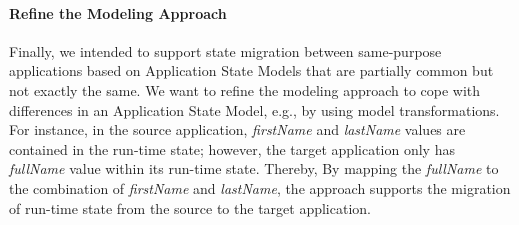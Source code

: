 \paragraph{Refine the Modeling Approach}
Finally, we intended to support state migration between same-purpose applications based on Application State Models that are partially common but not exactly the same.
We want to refine the modeling approach to cope with differences in an Application State Model, e.g., by using model transformations.
For instance, in the source application, \textit{firstName} and \textit{lastName} values are contained in the run-time state; however, the target application only has \textit{fullName} value within its run-time state.
Thereby, By mapping the \textit{fullName} to the combination of \textit{firstName} and \textit{lastName}, the approach supports the migration of run-time state from the source to the target application.



